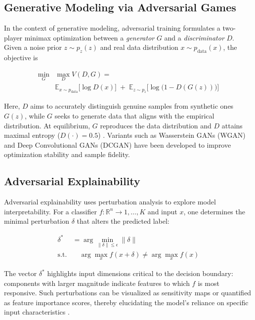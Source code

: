 \documentclass[10pt,twocolumn,letterpaper]{article}
\begin{document}
\subsection{Generative Modeling via Adversarial Games}

In the context of generative modeling, adversarial training formulates a two-player minimax optimization between a \emph{generator} $G$ and a \emph{discriminator} $D$. Given a noise prior $z\sim p_z(z)$ and real data distribution $x\sim p_{\mathrm{data}}(x)$, the objective is

$$
\begin{aligned}
\min_{G} &\max_{D} V(D,G)= \\
& \mathbb{E}_{x\sim p_{\mathrm{data}}}\bigl[\log D(x)\bigr]
\;+\;\mathbb{E}_{z\sim p_z}\bigl[\log\bigl(1 - D(G(z))\bigr)\bigr]
\end{aligned}
$$

Here, $D$ aims to accurately distinguish genuine samples from synthetic ones $G(z)$, while $G$ seeks to generate data that aligns with the empirical distribution. At equilibrium, $G$ reproduces the data distribution and $D$ attains maximal entropy ($D(\cdot)=0.5$) \cite{goodfellow2014generativeadversarialnetworks}. Variants such as Wasserstein GANs (WGAN) and Deep Convolutional GANs (DCGAN) have been developed to improve optimization stability and sample fidelity.

\subsection{Adversarial Explainability}

Adversarial explainability uses perturbation analysis to explore model interpretability. For a classifier $f: \mathbb{R}^n\to{1,\dots,K}$ and input $x$, one determines the minimal perturbation $\delta$ that alters the predicted label:

$$
\begin{aligned}
\delta^* &= \arg\min_{\|\delta\|\le\epsilon} \|\delta\| \\
\text{s.t.}&\quad
\arg\max_x f(x+\delta) \neq \arg\max_x f(x)
\end{aligned}
$$

The vector $\delta^*$ highlights input dimensions critical to the decision boundary: components with larger magnitude indicate features to which $f$ is most responsive. Such perturbations can be visualized as sensitivity maps or quantified as feature importance scores, thereby elucidating the model's reliance on specific input characteristics \cite{NEURIPS2019_e2c420d9, tsipras2019robustnessoddsaccuracy}.
\end{document}
